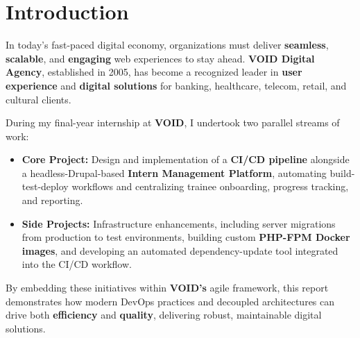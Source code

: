 \section{Introduction}
\noindent
In today's fast-paced digital economy, organizations must deliver \textbf{seamless}, \textbf{scalable}, and \textbf{engaging} web experiences to stay ahead. \textbf{VOID Digital Agency}, established in 2005, has become a recognized leader in \textbf{user experience} and \textbf{digital solutions} for banking, healthcare, telecom, retail, and cultural clients.

\medskip

\noindent
During my final-year internship at \textbf{VOID}, I undertook two parallel streams of work:
\begin{itemize}
  \item \textbf{Core Project:} Design and implementation of a \textbf{CI/CD pipeline} alongside a headless-Drupal-based \textbf{Intern Management Platform}, automating build-test-deploy workflows and centralizing trainee onboarding, progress tracking, and reporting.
  \item \textbf{Side Projects:} Infrastructure enhancements, including server migrations from production to test environments, building custom \textbf{PHP-FPM Docker images}, and developing an automated dependency-update tool integrated into the CI/CD workflow.
\end{itemize}

\medskip

\noindent
By embedding these initiatives within \textbf{VOID's} agile framework, this report demonstrates how modern DevOps practices and decoupled architectures can drive both \textbf{efficiency} and \textbf{quality}, delivering robust, maintainable digital solutions.

\enlargethispage{3\baselineskip}


